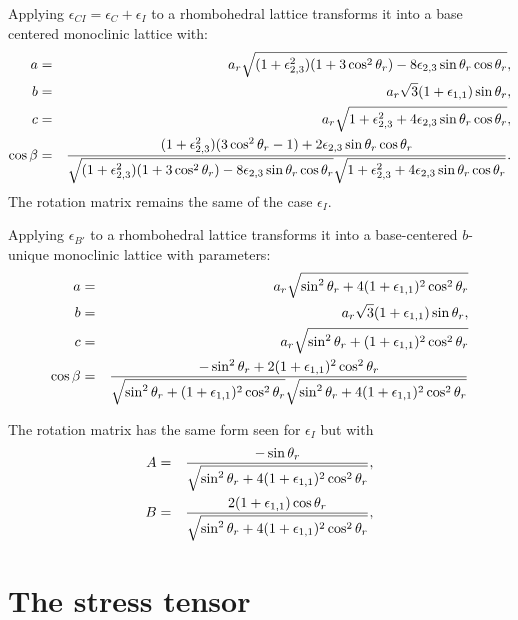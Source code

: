 \documentclass[12pt,a4paper,twoside]{report}
\begin{document}
Applying $\epsilon_{CI}=\epsilon_C+\epsilon_I$ to a rhombohedral lattice 
transforms it into a base centered monoclinic lattice with:
\begin{eqnarray}
a&=&a_r \sqrt{(1+\epsilon_{2,3}^2)(1 + 3 \cos^2 \theta_r)-
8\epsilon_{2,3}\sin \theta_r\cos \theta_r}, \\
b&=&a_r \sqrt{3}(1+\epsilon_{1,1}) \sin \theta_r, \\
c&=&a_r \sqrt{1+\epsilon_{2,3}^2+4\epsilon_{2,3}\sin \theta_r\cos \theta_r}, \\
\cos\beta &=& {(1+\epsilon_{2,3}^2) (3 \cos^2 \theta_r-1) 
+ 2 \epsilon_{2,3} \sin \theta_r\cos \theta_r
\over \sqrt{(1+\epsilon_{2,3}^2)(1 + 3 \cos^2 \theta_r)-
8\epsilon_{2,3}\sin \theta_r\cos \theta_r} \sqrt{1+\epsilon_{2,3}^2+4\epsilon_{2,3}\sin \theta_r\cos \theta_r}}.
\end{eqnarray}
The rotation matrix remains the same of the case $\epsilon_I$.

Applying $\epsilon_{B'}$ to a rhombohedral lattice transforms it into a
base-centered $b$-unique monoclinic lattice with parameters:
\begin{eqnarray}
a&=&a_r \sqrt{ \sin^2 \theta_r + 4 (1+\epsilon_{1,1})^2 \cos^2 \theta_r} \\
b&=&a_r \sqrt{3}(1+\epsilon_{1,1})\sin \theta_r, \\
c&=&a_r \sqrt{\sin^2 \theta_r + (1+\epsilon_{1,1})^2 \cos^2 \theta_r}\\
\cos\beta &=& { -\sin^2 \theta_r + 2 (1+\epsilon_{1,1})^2 \cos^2 \theta_r
\over 
\sqrt{\sin^2 \theta_r + (1+\epsilon_{1,1})^2 \cos^2 \theta_r}
\sqrt{\sin^2 \theta_r + 4 (1+\epsilon_{1,1})^2 \cos^2 \theta_r}}
\end{eqnarray}

The rotation matrix has the same form seen for $\epsilon_I$ but with
\begin{eqnarray}
A&=& {- \sin \theta_r \over 
\sqrt{\sin^2 \theta_r + 4 (1+\epsilon_{1,1})^2 \cos^2 \theta_r}}, \\
B&=& {2 (1+\epsilon_{1,1}) \cos \theta_r \over 
\sqrt{\sin^2 \theta_r + 4 (1+\epsilon_{1,1})^2 \cos^2 \theta_r}}, \\
\end{eqnarray}

\newpage
{\color{dark-blue}\chapter{The stress tensor}}
\color{black}
\end{document}
